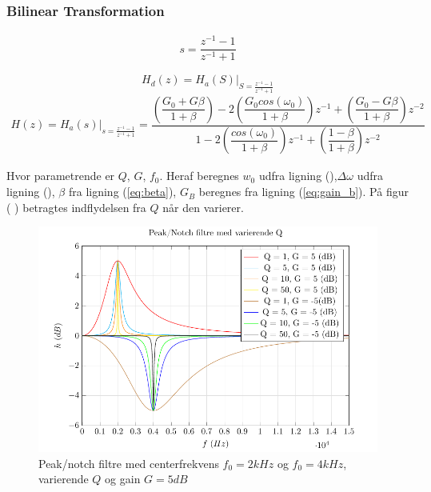         \subsubsection{Bilinear Transformation}


    \begin{align}
    s =   \dfrac{z^{-1} - 1}{z^{-1} + 1}
    \end{align}

    \begin{equation}
    H_d(z) = H_a(S)\bigg|_{S = \frac{z^{-1} -1 }{z^{-1} + 1}}
    \end{equation}
   \begin{align}
    H(z) = H_a(s)\bigg|_{s = \frac{z^{-1} -1 }{z^{-1} + 1}} = 
    \dfrac{\left(\dfrac{G_0 + G \beta}{1 + \beta} \right)- 2 \left(\dfrac{G_0 cos( \omega_0)}{1 +\beta} \right)z^{-1} + \left(\dfrac{ G_0 - G \beta}{1 + \beta }\right) z^{-2}}{1 - 2 \left(\dfrac{cos(\omega_0)}{1 + \beta}\right)z^{-1} + \left( \dfrac{1 - \beta}{1 + \beta} \right) z^{-2}}
   \end{align}

   Hvor parametrende er $Q$, $G$, $f_0$. Heraf beregnes $w_0$ udfra ligning (),$\Delta \omega$ udfra ligning (), $\beta$ fra ligning (\ref{eq:beta}), $G_B$ beregnes fra ligning (\ref{eq:gain_b}).
   På figur (
       ) betragtes indflydelsen fra $Q$ når den varierer.

 \begin{figure}[h]
    \centering
         \includegraphics{figure/iir_peak.pdf}
        \caption{Peak/notch filtre med centerfrekvens $f_0 = 2kHz$ og $f_0 = 4kHz$, varierende $Q$ og gain $G=5dB$}
        \label{fig:iir_peak}
    \end{figure} 


